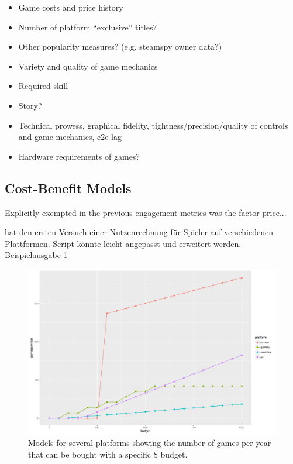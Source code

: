 \begin{itemize}
	\item Game costs and price history
	\item Number of platform ``exclusive'' titles?
	\item Other popularity measures? (e.g. steamspy owner data?)
	\item Variety and quality of game mechanics
	\item Required skill
	\item Story?
	\item Technical prowess, graphical fidelity, tightness/precision/quality of controls and game mechanics, e2e lag
	\item Hardware requirements of games?
\end{itemize}


\subsection{Cost-Benefit Models}

Explicitly exempted in the previous engagement metrics was the factor price...



 hat den ersten Versuch einer Nutzenrechnung für Spieler auf verschiedenen Plattformen. Script könnte leicht angepasst und erweitert werden. Beispielausgabe \ref{fig:gamesperyear-over-budget}



\begin{figure}[!t]
	\centering
	\includegraphics[width=1.0\columnwidth]{images/gamesperyear-over-budget.pdf}
	\caption{Models for several platforms showing the number of games per year that can be bought with a specific \$ budget.}
\label{fig:gamesperyear-over-budget}
\end{figure}


